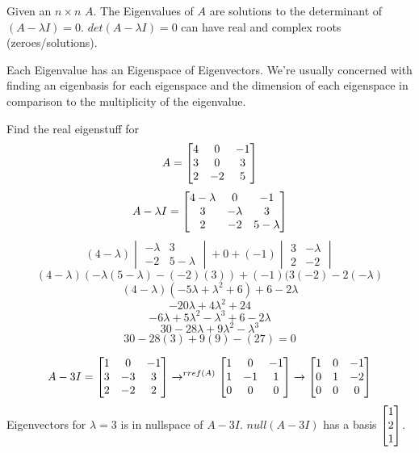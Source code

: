 Given an $n \times n$ $A$. The Eigenvalues of $A$ are solutions to the determinant of $(A - \lambda I) = 0$. $det(A-\lambda I) = 0$ can have real and complex roots (zeroes/solutions).

Each Eigenvalue has an Eigenspace of Eigenvectors. We're usually concerned with finding an eigenbasis for each eigenspace and the dimension of each eigenspace in comparison to the multiplicity of the eigenvalue.

\begin{example}
Find the real eigenstuff for 
\[ A = \begin{bmatrix}4 & 0 & -1 \\ 3 & 0 & 3 \\ 2 & -2 & 5\end{bmatrix} \]
\[ A-\lambda I = \begin{bmatrix}4-\lambda & 0 & -1 \\ 3 & -\lambda & 3 \\ 2 & -2 & 5-\lambda\end{bmatrix}\]
\[ (4-\lambda) \begin{vmatrix} -\lambda & 3 \\ -2 & 5-\lambda \end{vmatrix} + 0 + (-1) \begin{vmatrix} 3 & -\lambda \\ 2 & -2\end{vmatrix} \]
\[ (4-\lambda) \left( -\lambda(5-\lambda)-(-2)(3)\right) + (-1)(3(-2)-2(-\lambda)\]
\[ (4-\lambda)(-5\lambda+\lambda^2+6) + 6 -2\lambda\]
\[ -20\lambda +4\lambda^2+24\]
\[ -6\lambda+5\lambda^2-\lambda^3+6-2\lambda\]
\[ 30-28\lambda+9\lambda^2-\lambda^3\]
\[ 30-28(3)+9(9)-(27) = 0\]

\[ A-3I = \begin{bmatrix}1 & 0 & -1 \\ 3 & -3 & 3 \\ 2 & -2 & 2\end{bmatrix} \to^{rref(A)} \begin{bmatrix}1& 0 & -1 \\ 1 & -1 & 1 \\ 0 & 0 & 0\end{bmatrix} \to \begin{bmatrix}1 & 0 & -1 \\ 0 & 1 & -2 \\ 0 & 0 & 0\end{bmatrix}\]
Eigenvectors for $\lambda=3$ is in nullspace of $A-3I$. $null(A-3I)$ has a basis $\begin{bmatrix}1 \\ 2 \\ 1\end{bmatrix}$.
\end{example}

